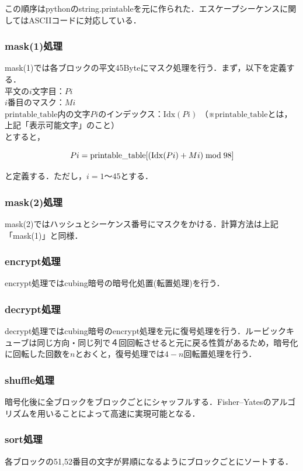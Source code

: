 \documentclass{jsarticle}
\begin{document}
この順序はpythonのstring.printableを元に作られた．エスケープシーケンスに関してはASCIIコードに対応している．

\subsubsection{mask(1)処理}
mask(1)では各ブロックの平文45Byteにマスク処理を行う．まず，以下を定義する．\\
平文の\(i\)文字目：\(Pi\)\\
\(i\)番目のマスク：\(Mi\)\\
\(\mathrm{printable\_table}\)内の文字\(Pi\)のインデックス：\(\mathrm{Idx}(Pi)\) （※\(\mathrm{printable\_table}\)とは，上記「表示可能文字」のこと）\\
とすると，


\[Pi=\mathrm{printable\_table}[(\mathrm{Idx}(Pi)+Mi) \bmod 98]\\\]


と定義する．ただし，\(i=1〜45\)とする．

\subsubsection{mask(2)処理}
mask(2)ではハッシュとシーケンス番号にマスクをかける．計算方法は上記「mask(1)」と同様．

\subsubsection{encrypt処理}
encrypt処理ではcubing暗号の暗号化処置(転置処理)を行う．

\subsubsection{decrypt処理}
decrypt処理ではcubing暗号のencrypt処理を元に復号処理を行う．ルービックキューブは同じ方向・同じ列で４回回転させると元に戻る性質があるため，暗号化に回転した回数を\(n\)とおくと，復号処理では\(4-n\)回転置処理を行う．

\subsubsection{shuffle処理}
暗号化後に全ブロックをブロックごとにシャッフルする．Fisher–Yatesのアルゴリズムを用いることによって高速に実現可能となる．

\subsubsection{sort処理}
各ブロックの51,52番目の文字が昇順になるようにブロックごとにソートする．
\end{document}
